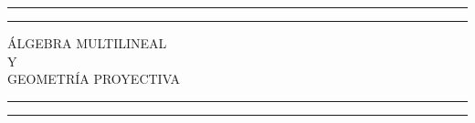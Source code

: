 \newcommand{\plogo}{\fbox{$\mathcal{PL}$}} %

\begin{titlepage} %

	\centering %

	\scshape %

	\vspace*{\baselineskip} %


	\rule{\textwidth}{1.6pt}\vspace*{-\baselineskip}\vspace*{2pt} %
	\rule{\textwidth}{0.4pt} %

	\vspace{0.75\baselineskip} %

	{\LARGE ÁLGEBRA MULTILINEAL\\ Y\\ GEOMETRÍA PROYECTIVA\\} %

	\vspace{0.75\baselineskip} %

	\rule{\textwidth}{0.4pt}\vspace*{-\baselineskip}\vspace{3.2pt} %
	\rule{\textwidth}{1.6pt} %

	\vspace{1\baselineskip} %



	\vspace*{1\baselineskip} %




	\vspace{1\baselineskip} %


\end{titlepage}
